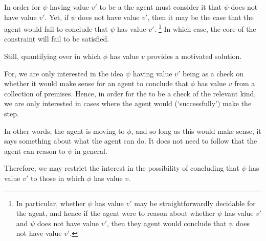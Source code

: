 \begin{note}[Problem]
  In order for \(\psi\) having value \(v'\) to be a \crequ{} the agent must consider it \epVAd{} that \(\psi\) does not have value \(v'\).
  Yet, if \(\psi\) does not have value \(v'\), then it may be the case that the agent would fail to conclude that \(\psi\) has value \(v'\).\nolinebreak
  \footnote{
    In particular, whether \(\psi\) has value \(v'\) may be straightforwardly decidable for the agent, and hence if the agent were to reason about whether \(\psi\) has value \(v'\) and \(\psi\) does not have value \(v'\), then they agent would conclude that \(\psi\) does not have value \(v'\).
  }
  In which case, the core of the constraint will fail to be satisfied.
\end{note}

\begin{note}[Solution]
  \color{red}
  Still, quantifying over  in which \(\phi\) has value \(v\) provides a motivated solution.

  For, we are only interested in the idea \(\psi\) having value \(v'\) being \crequ{} as a check on whether it would make sense for an agent to conclude that \(\phi\) has value \(v\) from a collection of premises.
  Hence, in order for the \crequ{} to be a check of the relevant kind, we are only interested in cases where the agent would (`successfully') make the step.

  In other words, the agent is moving to \(\phi\), and so long as this would make sense, it says something about what the agent can do.
  It does not need to follow that the agent can reason to \(\psi\) in general.

  Therefore, we may restrict the interest in the possibility of concluding that \(\psi\) has value \(v'\) to those  in which \(\phi\) has value \(v\).
\end{note}


